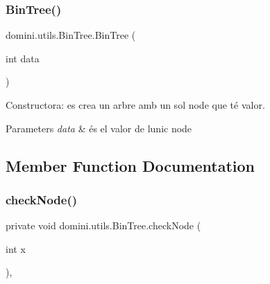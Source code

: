 \mbox{\label{classdomini_1_1utils_1_1BinTree_a83904c6ebf931ba29a134be5f29a66c7}} 
\subsubsection{\texorpdfstring{Bin\+Tree()}{BinTree()}\hspace{0.1cm}{\footnotesize\ttfamily [2/2]}}
{\footnotesize\ttfamily domini.\+utils.\+Bin\+Tree.\+Bin\+Tree (\begin{DoxyParamCaption}\item[{int}]{data }\end{DoxyParamCaption})\hspace{0.3cm}{\ttfamily [inline]}}



Constructora\+: es crea un arbre amb un sol node que té valor. 


\begin{DoxyParams}{Parameters}
{\em data} & és el valor de l\textquotesingle{}unic node \\
\hline
\end{DoxyParams}


\subsection{Member Function Documentation}
\mbox{\label{classdomini_1_1utils_1_1BinTree_a32b3e2ad7dfee3425e0b1f6f8b5100f5}} 
\subsubsection{\texorpdfstring{check\+Node()}{checkNode()}}
{\footnotesize\ttfamily private void domini.\+utils.\+Bin\+Tree.\+check\+Node (\begin{DoxyParamCaption}\item[{int}]{x }\end{DoxyParamCaption})\hspace{0.3cm}{\ttfamily [inline]}, {\ttfamily [private]}}



